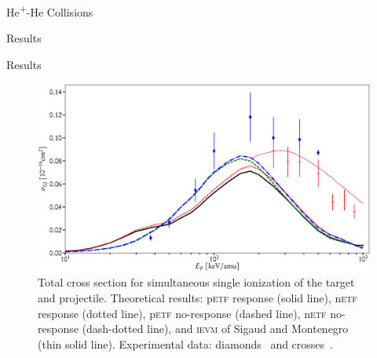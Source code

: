 \documentclass[letterpaper, 11 pt]{report}
\begin{document}
\begin{chapter}{\texorpdfstring{He\textsuperscript{+}}{He+}-He Collisions \label{chap:hephe}}
\begin{section}{Results \label{sec:hephe-disc}}
\begin{subsection}{Results \label{sec:hephe-res}}
         \begin{figure}[t]
            \centering
            \includegraphics[width = \linewidth]{./images/hephe-cross/HepHe-102.eps}
            \caption[Total cross section for simultaneous single ionization of the target and projectile
                     in He\textsuperscript{+}-He collisions.]
                    {Total cross section for simultaneous single ionization of the target and
                     projectile.
                     Theoretical results: p\textsc{etf} response (solid line), n\textsc{etf} response
                                          (dotted line), p\textsc{etf} no-response (dashed line),
                                          n\textsc{etf} no-response (dash-dotted line), and
                                          \textsc{ievm} of Sigaud and Montenegro~\cite{SM-03} (thin
                                          solid line).
                     Experimental data: diamonds~\cite{Dub-89} and crosses~\cite{SSMSM-11}.
                     \label{fig:cs102}}
         \end{figure}


\end{subsection}
\end{section}
\end{chapter}
\end{document}
